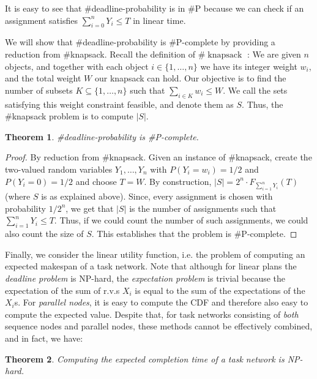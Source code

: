 \documentclass{article}
\newtheorem{theorem}{Theorem}
\begin{document}
It is easy to see that \#deadline-probability is in \#P because we can check if an assignment satisfies $\sum_{i=0}^{n} Y_{i} \leq T$ in linear time.

We will show that \#deadline-probability is \#P-complete by providing a reduction from \#knapsack. Recall the definition of $\#\operatorname{knapsack}$ \cite{arora2009computational}: We are given $n$ objects, and together with each object $i\in \{1,\dots , n\}$ we have its integer weight $w_i$, and the total weight $W$ our knapsack can hold. Our objective is to find the number of subsets $K \subseteq \{1, \dots , n\}$ such that $\sum_{i \in K} w_i \leq W$. We call the sets satisfying this weight constraint feasible, and denote them as $S$. Thus, the \#knapsack problem is to compute $|S|$.

\begin{theorem} \label{deadlinSP}
\#deadline-probability is \#P-complete.
\end{theorem}

\begin{proof} By reduction from \#knapsack. Given an instance of \#knapsack, create the two-valued random variables $Y_{1},\dots,Y_{n} $ with $P(Y_i=w_i)=1/2$ and $P(Y_i=0)=1/2$ and choose $T=W$. By construction, $|S|=2^n \cdot F_{\sum_{i=1}^{n} Y_{i}}(T)$ (where $S$ is as explained above). Since, every assignment is chosen with probability $1/2^n$, we get that $|S|$ is the number of assignments such that $\sum_{i=1}^{n} Y_{i} \leq T$. Thus, if we could count the number of such assignments, we could also count the size of $S$. This establishes that the problem is \#P-complete. 
\end{proof}

Finally, we consider the linear utility function, i.e. the problem
of computing an expected makespan of a task network.
Note that although for linear plans the {\em deadline problem} is NP-hard, the {\em expectation problem} is trivial because the expectation
of the sum of r.v.s $X_i$ is equal to the sum of the expectations of the $X_i$s.
For {\em parallel nodes}, it is easy to compute the CDF and therefore also easy to
compute the expected value.
Despite that, for task networks consisting of {\em  both} sequence nodes and
parallel nodes, these methods cannot be effectively combined, and in fact, we have:
\begin{theorem}
Computing the expected completion time of a task network is NP-hard.
\end{theorem}
\end{document}
